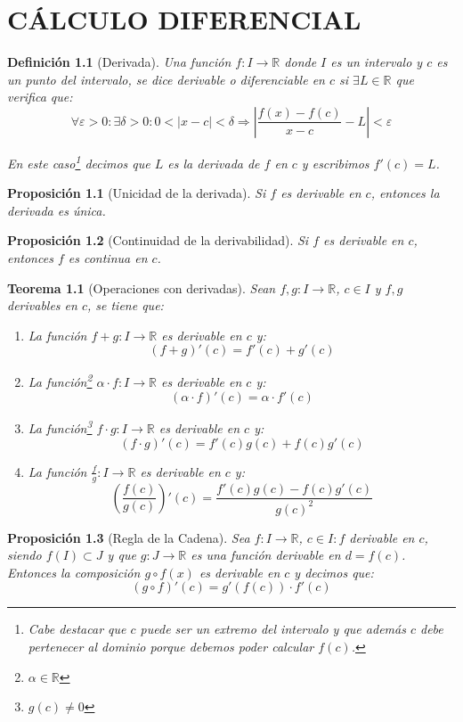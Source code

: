\documentclass[10pt,a4paper,openright]{book}
\newtheorem{teorema}{Teorema}[chapter]
\newtheorem{proposicion}{Proposición}[chapter]
\newtheorem{definicion}{Definición}[chapter]
\begin{document}
\chapter{CÁLCULO DIFERENCIAL}

\begin{definicion}[Derivada]
Una función $f: I\rightarrow \mathbb R$ donde $I$ es un intervalo y $c$ es un punto del intervalo, se dice derivable o diferenciable en $c$ si $\exists L\in \mathbb R$ que verifica que:
$$\forall \varepsilon>0: \exists \delta>0 : 0<|x-c|<\delta\Rightarrow \left|\frac{f(x)-f(c)}{x-c}-L\right|<\varepsilon$$

En este caso\footnote{Cabe destacar que $c$ puede ser un extremo del intervalo y que además $c$ debe pertenecer al dominio porque debemos poder calcular $f(c)$.} decimos que $L$ es la derivada de $f$ en $c$ y escribimos $f'(c)=L$.

\end{definicion}

\begin{proposicion}[Unicidad de la derivada]
Si $f$ es derivable en $c$, entonces la derivada es única.
\end{proposicion}

\begin{proposicion}[Continuidad de la derivabilidad]
Si $f$ es derivable en $c$, entonces $f$ es continua en $c$.
\end{proposicion}

\begin{teorema}[Operaciones con derivadas]
Sean $f,g: I\rightarrow \mathbb R$, $c\in I$ y $f,g$ derivables en $c$, se tiene que:
\begin{enumerate}
\item La función $f+g: I\rightarrow \mathbb R$ es derivable en $c$ y:
$$(f+g)'(c)=f'(c)+g'(c)$$
\item La función\footnote{$\alpha \in \mathbb R$} $\alpha \cdot f: I\rightarrow \mathbb R$ es derivable en $c$ y:
$$(\alpha \cdot f)'(c)=\alpha \cdot f'(c)$$
\item La función\footnote{$g(c) \neq 0$}  $f\cdot g: I\rightarrow \mathbb R$ es derivable en $c$ y:
$$(f\cdot g)'(c)=f'(c)g(c)+ f(c)g'(c)$$
\item La función $\frac{f}{g}: I\rightarrow \mathbb R$ es derivable en $c$ y:
$$\left(\frac{f(c)}{g(c)}\right)'(c)=\frac{f'(c)g(c)-f(c)g'(c)}{g(c)^2}$$
\end{enumerate}
\end{teorema}

\begin{proposicion}[Regla de la Cadena]
Sea $f: I \rightarrow \mathbb R $, $c\in I: f$ derivable en $c$, siendo $f(I)\subset J$ y que $g: J\rightarrow \mathbb R$ es una función derivable en $d=f(c)$. Entonces la composición $g\circ f (x)$ es derivable en $c$ y decimos que:
$$(g\circ f)'(c)=g'(f(c))\cdot f'(c)$$
\end{proposicion}
\end{document}
